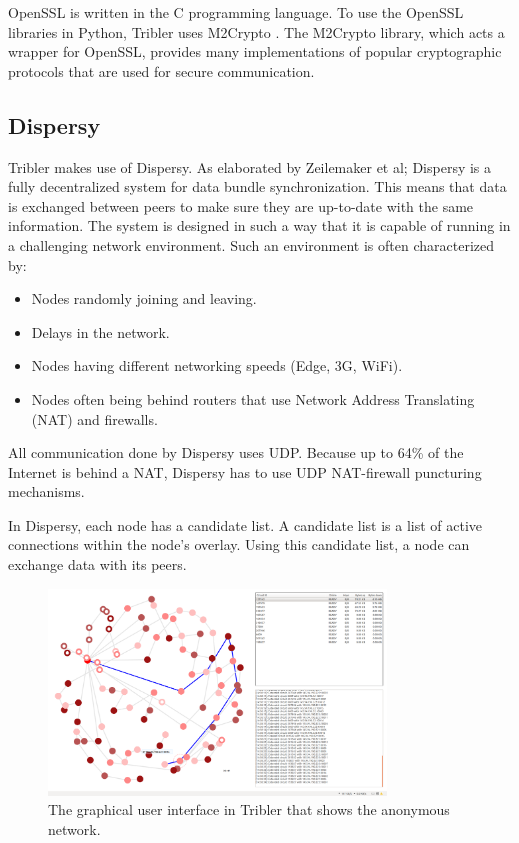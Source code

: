 		OpenSSL is written in the C programming language. To use the OpenSSL libraries in Python, Tribler uses M2Crypto \cite{m2cryptogithub}. The M2Crypto library, which acts a wrapper for OpenSSL, provides many implementations of popular cryptographic protocols that are used for secure communication.
		
	\subsection{Dispersy}
	\label{sec:dispersy}
		Tribler makes use of Dispersy. As elaborated by Zeilemaker et al; Dispersy \cite{zeilemaker2013dispersy} is a fully decentralized system for data bundle synchronization. This means that data is exchanged between peers to make sure they are up-to-date with the same information. The system is designed in such a way that it is capable of running in a challenging network environment. Such an environment is often characterized by:
		\begin{itemize}
			\item Nodes randomly joining and leaving.
			\item Delays in the network.
			\item Nodes having different networking speeds (Edge, 3G, WiFi).
			\item Nodes often being behind routers that use Network Address Translating (NAT) and firewalls.
		\end{itemize}
		
		All communication done by Dispersy uses UDP. Because up to 64\% of the Internet is behind a NAT, Dispersy has to use UDP NAT-firewall puncturing mechanisms\cite{zeilemaker2013dispersy}.
		
		In Dispersy, each node has a candidate list. A candidate list is a list of active connections within the node's overlay. Using this candidate list, a node can exchange data with its peers.
		
		\begin{figure}[!t]
			\centering
			\includegraphics[width=0.8\textwidth]{prior-work/8hop.png}
			\caption{The graphical user interface in Tribler that shows the anonymous network.}
			\label{fig:anon_downloads}
		\end{figure}